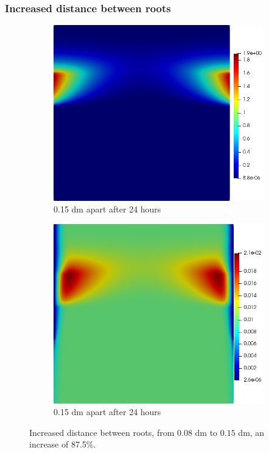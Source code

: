 \documentclass[11pt]{article}
\numberwithin{equation}{section}
\begin{document}
\subsubsection{Increased distance between roots}
 \begin{figure}
     \centering
     \begin{subfigure}[t]{0.35\textwidth}
     \includegraphics[width=\textwidth]{Figures/testpics/0.15ApartDMA24.png}
     \caption{0.15 dm apart  after 24 hours}
     \end{subfigure}
     \hspace{1cm}
     \begin{subfigure}[t]{0.35\textwidth}
     \includegraphics[width=\textwidth]{Figures/testpics/0.15ApartZn24.png}
     \caption{0.15 dm apart  after 24 hours}
     \end{subfigure}
     \caption{Increased distance between roots, from $0.08$ dm to $0.15$ dm, an increase of 87.5\%.}
 \end{figure}
\end{document}
